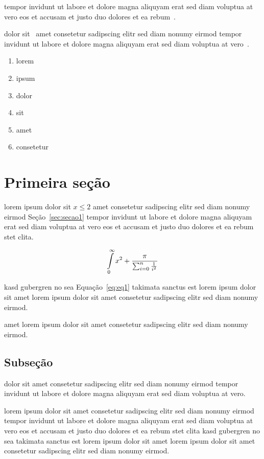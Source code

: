 tempor invidunt ut labore et dolore magna aliquyam erat sed diam
voluptua at vero eos et accusam et justo duo dolores et ea
rebum~\cite{CORMEMALGORITHMS01}.

dolor sit~\cite{BENTLEYBC07} amet consetetur sadipscing elitr sed
diam nonumy eirmod tempor invidunt ut labore et dolore magna
aliquyam erat sed diam voluptua at vero~\cite{BRIANPL04}.

\begin{enumerate}
   \item lorem
   \item ipsum
   \item dolor
   \item sit
   \item amet
   \item consetetur
\end{enumerate}

\section{\label{sec:secao1}Primeira seção}

lorem ipsum dolor sit $x\leq 2$  amet consetetur sadipscing elitr
sed diam nonumy eirmod Seção~\ref{sec:secao1} tempor invidunt ut
labore et dolore magna aliquyam erat sed diam voluptua at vero eos
et accusam et justo duo dolores et ea rebum stet
clita.~\cite{OLIVEIRAAPL08}

\begin{equation}\label{eq:eq1}
    \intop_{0}^{\infty}{x^2 + \frac{\pi}{\sum_{i=0}^{n}{\frac{1}{i^2}}}}
\end{equation}

kasd gubergren no sea Equação~\eqref{eq:eq1} takimata sanctus est
lorem ipsum dolor sit amet lorem ipsum dolor sit amet consetetur
sadipscing elitr sed diam nonumy eirmod.~\cite{PICCOLIAPL11}

amet lorem ipsum dolor sit amet consetetur sadipscing elitr sed
diam nonumy eirmod.~\cite{PICCOLIDM08}

\subsection{Subseção}

dolor sit amet consetetur sadipscing elitr sed diam nonumy eirmod
tempor invidunt ut labore et dolore magna aliquyam erat sed diam
voluptua at vero.

lorem ipsum dolor sit amet consetetur sadipscing elitr sed diam
nonumy eirmod tempor invidunt ut labore et dolore magna aliquyam
erat sed diam voluptua at vero eos et accusam et justo duo dolores
et ea rebum stet clita kasd gubergren no sea takimata sanctus est
lorem ipsum dolor sit amet lorem ipsum dolor sit amet consetetur
sadipscing elitr sed diam nonumy eirmod.


